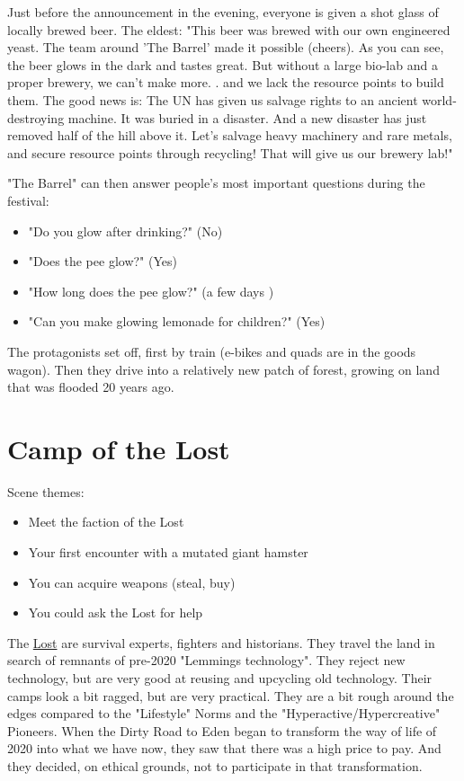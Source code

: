 Just before the announcement in the evening, everyone is given a shot glass of locally brewed beer. The eldest: "This beer was brewed with our own engineered yeast. The team around 'The Barrel' made it possible (cheers). As you can see, the beer glows in the dark and tastes great. But without a large bio-lab and a proper brewery, we can't make more. . and we lack the resource points to build them. The good news is: The UN has given us salvage rights to an ancient world-destroying machine. It was buried in a disaster. And a new disaster has just removed half of the hill above it. Let's salvage heavy machinery and rare metals, and secure resource points through recycling! That will give us our brewery lab!"

"The Barrel" can then answer people's most important questions during the festival:
\begin{itemize}
\item "Do you glow after drinking?" (No)
\item "Does the pee glow?" (Yes)
\item "How long does the pee glow?" (a few days )
\item "Can you make glowing lemonade for children?" (Yes)
\end{itemize}

The protagonists set off, first by train (e-bikes and quads are in the goods wagon). Then they drive into a relatively new patch of forest, growing on land that was flooded 20 years ago.


\section{Camp of the Lost}

Scene themes:

\begin{itemize}
\item Meet the faction of the Lost
\item Your first encounter with a mutated giant hamster
\item You can acquire weapons (steal, buy)
\item You could ask the Lost for help
\end{itemize}

\begin{sidebarBox}[title=The Lost]
The \hyperref[sec:Lost]{Lost} are survival experts, fighters and historians. They travel the land in search of remnants of pre-2020 "Lemmings technology". They reject new technology, but are very good at reusing and upcycling old technology. Their camps look a bit ragged, but are very practical. They are a bit rough around the edges compared to the "Lifestyle" Norms and the "Hyperactive/Hypercreative" Pioneers. When the Dirty Road to Eden began to transform the way of life of 2020 into what we have now, they saw that there was a high price to pay. And they decided, on ethical grounds, not to participate in that transformation.
\end{sidebarBox}

